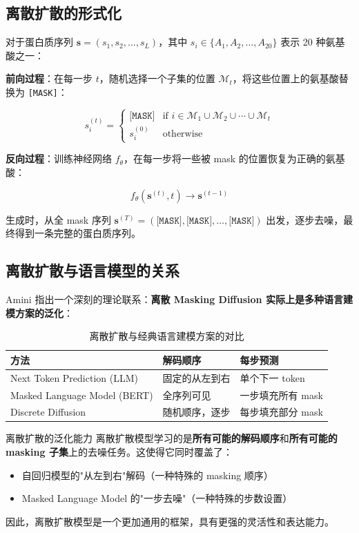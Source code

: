 \documentclass[a4paper]{article}
\begin{document}
\subsection{离散扩散的形式化}

对于蛋白质序列 $\mathbf{s} = (s_1, s_2, \ldots, s_L)$，其中 $s_i \in \{A_1, A_2, \ldots, A_{20}\}$ 表示 20 种氨基酸之一：

\textbf{前向过程}：在每一步 $t$，随机选择一个子集的位置 $\mathcal{M}_t$，将这些位置上的氨基酸替换为 \texttt{[MASK]}：

$$s_i^{(t)} = \begin{cases} \texttt{[MASK]} & \text{if } i \in \mathcal{M}_1 \cup \mathcal{M}_2 \cup \cdots \cup \mathcal{M}_t \\ s_i^{(0)} & \text{otherwise} \end{cases}$$

\textbf{反向过程}：训练神经网络 $f_\theta$，在每一步将一些被 mask 的位置恢复为正确的氨基酸：

$$f_\theta(\mathbf{s}^{(t)}, t) \rightarrow \mathbf{s}^{(t-1)}$$

生成时，从全 mask 序列 $\mathbf{s}^{(T)} = (\texttt{[MASK]}, \texttt{[MASK]}, \ldots, \texttt{[MASK]})$ 出发，逐步去噪，最终得到一条完整的蛋白质序列。

\subsection{离散扩散与语言模型的关系}

Amini 指出一个深刻的理论联系：\textbf{离散 Masking Diffusion 实际上是多种语言建模方案的泛化}：

\begin{table}[H]
\centering
\caption{离散扩散与经典语言建模方案的对比}
\begin{tabular}{@{}lll@{}}
\toprule
\textbf{方法} & \textbf{解码顺序} & \textbf{每步预测} \\
\midrule
Next Token Prediction (LLM) & 固定的从左到右 & 单个下一 token \\
Masked Language Model (BERT) & 全序列可见 & 一步填充所有 mask \\
Discrete Diffusion & 随机顺序，逐步 & 每步填充部分 mask \\
\bottomrule
\end{tabular}
\end{table}

\begin{importantbox}{离散扩散的泛化能力}
离散扩散模型学习的是\textbf{所有可能的解码顺序}和\textbf{所有可能的 masking 子集}上的去噪任务。这使得它同时覆盖了：
\begin{itemize}
    \item 自回归模型的"从左到右"解码（一种特殊的 masking 顺序）
    \item Masked Language Model 的"一步去噪"（一种特殊的步数设置）
\end{itemize}
因此，离散扩散模型是一个更加通用的框架，具有更强的灵活性和表达能力。
\end{importantbox}
\end{document}

